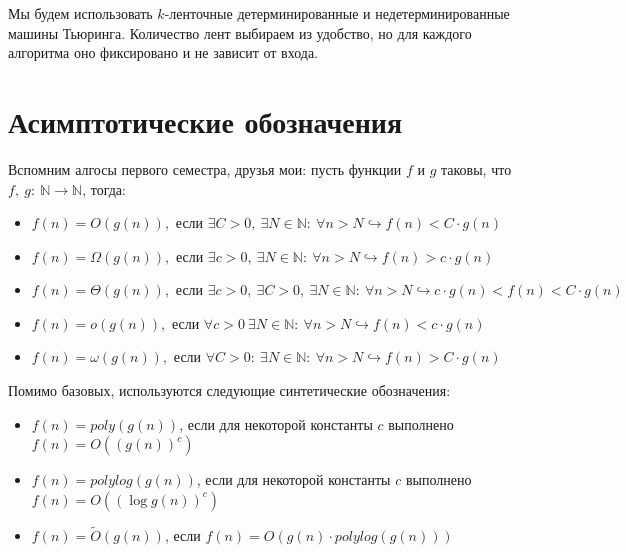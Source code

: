 \documentclass[11pt]{article}
\begin{document}
\begin{remark}
    Мы будем использовать $k$-ленточные детерминированные и недетерминированные машины Тьюринга. Количество лент выбираем из удобство, но для 
    каждого алгоритма оно фиксировано и не зависит от входа.
\end{remark}

\section{Асимптотические обозначения}

Вспомним алгосы первого семестра, друзья мои: пусть функции $f$ и $g$ таковы, что $f, \ g: \ \mathbb{N} \to \mathbb{N}$, тогда:
\begin{itemize}
    \item $ f(n) = O(g(n)), \text{ если } \exists C > 0, \ \exists N \in \mathbb{N}: \ \forall n > N \hookrightarrow f(n) < C \cdot g(n)$
    
    \item $ f(n) = \Omega(g(n)), \text{ если } \exists c > 0, \ \exists N \in \mathbb{N}: \ \forall n > N \hookrightarrow f(n) > c \cdot g(n)$
    
    \item $ f(n) = \Theta(g(n)), \text{ если } \exists c > 0, \ \exists C > 0, \ \exists N \in \mathbb{N}: \ \forall n > N \hookrightarrow 
    c \cdot g(n) < f(n) < C \cdot g(n)$
    
    \item $ f(n) = o(g(n)), \text{ если } \forall c > 0 \ \exists N \in \mathbb{N}: \ \forall n > N \hookrightarrow f(n) < c \cdot g(n)$
    
    \item $ f(n) = \omega(g(n)), \text{ если } \forall C > 0: \ \exists N \in \mathbb{N}: \ \forall n > N \hookrightarrow f(n) > C \cdot g(n)$
\end{itemize}
\leavevmode
Помимо базовых, используются следующие синтетические обозначения:
\begin{itemize}
    \item $f(n) = poly(g(n))$, если для некоторой константы $c$ выполнено $f(n) = O({(g(n))}^c)$
    
    \item $f(n) = polylog(g(n))$, если для некоторой константы $c$ выполнено $f(n) = O((\log g(n))^c)$
    
    \item $f(n) = \widetilde{O}(g(n))$, если $f(n) = O(g(n) \cdot polylog(g(n)))$
\end{itemize}
\end{document}
